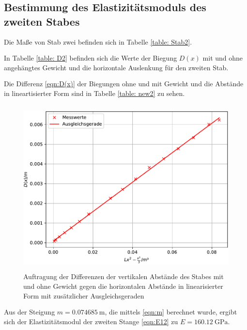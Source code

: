 \subsection{Bestimmung des Elastizitätsmoduls des zweiten Stabes}
Die Maße von Stab zwei befinden sich in Tabelle \ref{table: Stab2}.

\noindent In Tabelle \ref{table: D2} befinden sich die Werte der Biegung $D(x)$
mit und ohne angehängtes Gewicht und die horizontale Auslenkung %
für den zweiten Stab.

\noindent Die Differenz \eqref{eqn:D(x)} der Biegungen ohne und mit Gewicht und die Abstände in
lineartisierter Form sind in Tabelle \ref{table: new2} zu sehen.

\begin{figure}

  \centering
  \includegraphics[width=12cm, height=9cm]{./plots/Stange2.pdf}
  \caption{Auftragung der Differenzen der vertikalen Abstände des Stabes mit und ohne Gewicht gegen die horizontalen Abstände in linearisierter Form mit zusätzlicher Ausgleichsgeraden}
  \label{fig:plot2}
\end{figure}
\noindent Aus der Steigung $m = \SI{0.074685}{\meter}$, die mittels \eqref{eqn:m}
berechnet wurde, ergibt sich der Elastizitätsmodul der zweiten Stange \eqref{eqn:E12} zu
$E = \SI{160.12}{\giga\pascal}$.
\newpage

